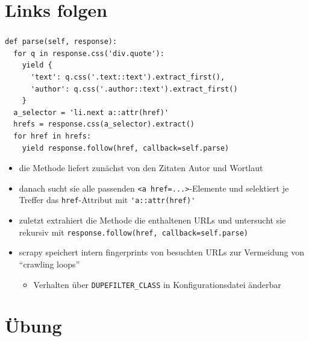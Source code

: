 \documentclass{beamer}
\begin{document}
\section{Links folgen}
\begin{frame}
	\frametitle{\insertsection{}}
	\begin{lstlisting}
def parse(self, response):
  for q in response.css('div.quote'):
    yield {
      'text': q.css('.text::text').extract_first(),
      'author': q.css('.author::text').extract_first()
    }
  a_selector = 'li.next a::attr(href)'
  hrefs = response.css(a_selector).extract()  
  for href in hrefs:    
    yield response.follow(href, callback=self.parse)
	\end{lstlisting}
	\begin{itemize}
		\item die Methode liefert zunächst von den Zitaten Autor und Wortlaut
		\item danach sucht sie alle passenden \lstinline|<a href=...>|-Elemente und selektiert je Treffer das \lstinline|href|-Attribut mit \lstinline|'a::attr(href)'| 
		
		\framebreak
		

		\item zuletzt extrahiert die Methode die enthaltenen URLs und untersucht sie rekursiv mit \lstinline|response.follow(href, callback=self.parse)| 
		\item scrapy speichert intern fingerprints von besuchten URLs zur Vermeidung von ``crawling loops'' \begin{itemize}
			\item Verhalten über \lstinline|DUPEFILTER_CLASS| in Konfigurationsdatei änderbar
		\end{itemize}
	\end{itemize}
\end{frame}



\section{Übung}
\end{document}
